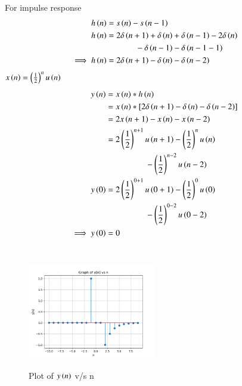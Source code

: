 \documentclass[journal,12pt,twocolumn]{IEEEtran}
\theoremstyle{remark}
\begin{document}
\noindent For impulse response
\begin{align}
h\left(n\right)&=s\left(n\right)-s\left(n-1\right)\\
\notag h\left(n\right) &=2\delta\left(n+1\right)+\delta\left(n\right)+\delta\left(n-1\right)-2\delta\left(n\right) \\
&~~~~~~~~~~~~~~-\delta\left(n-1\right)-\delta\left(n-1-1\right)\\
\implies h\left(n\right) &=2\delta\left(n+1\right)-\delta\left(n\right)-\delta\left(n-2\right)
\end{align}
$x\left(n\right)=\left(\frac{1}{2}\right)^nu\left(n\right)$
\begin{align}
y\left(n\right) &= x\left(n\right)*h\left(n\right)\\
 &= x\left(n\right)*[2\delta\left(n+1\right)-\delta\left(n\right)-\delta\left(n-2\right)]\\
 &= 2x\left(n+1\right)-x\left(n\right)-x\left(n-2\right)\\
\notag  &=2\left(\frac{1}{2}\right)^{n+1}u\left(n+1\right)-\left(\frac{1}{2}\right)^nu\left(n\right)\\
&~~~~~~~~~~~~~~~~~~~-\left(\frac{1}{2}\right)^{n-2}u\left(n-2\right)\\
\notag y\left(0\right) &=2\left(\frac{1}{2}\right)^{0+1}u\left(0+1\right)-\left(\frac{1}{2}\right)^0u\left(0\right)\\
&~~~~~~~~~~~~~~~~~~~-\left(\frac{1}{2}\right)^{0-2}u\left(0-2\right)\\
\implies y\left(0\right) &=0
\end{align}\\
\pagebreak
\begin{figure}[h]
    \includegraphics[width=0.5\textwidth]{figs/y(n) vs n.png}\label{fig:stem plot}
    \caption{Plot of $y\left(n\right)$ v/s n}
\end{figure}
\end{document}
